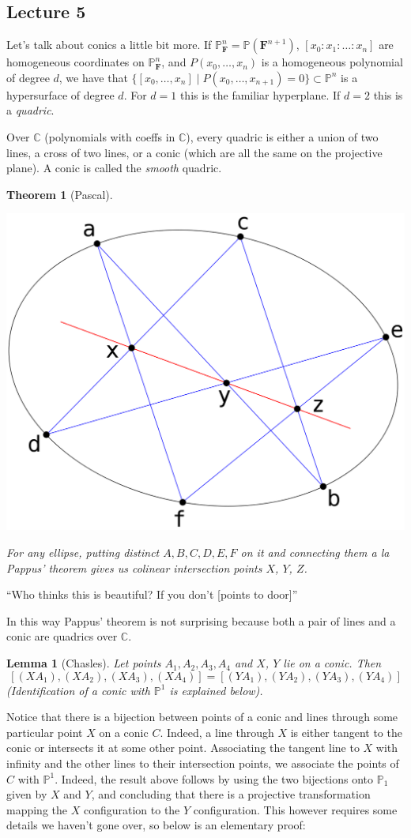 \documentclass[12pt]{article}
\newcommand{\F}{\mathbf{F}}
\newcommand{\C}{\mathbb{C}}
\renewcommand{\P}{\mathbb{P}}
\newtheorem{theorem}{Theorem}[section]
\newtheorem{lemma}{Lemma}[section]
\begin{document}
    \subsection{Lecture 5}
    Let's talk about conics a little bit more. If $\P_\F^n = \P(\F^{n+1})$, $[x_0: x_1: \dots : x_n]$ are homogeneous coordinates on $\P_\F^n$, and $P(x_0, \dots, x_n)$ is a homogeneous polynomial of degree $d$, we have that $\{[x_0, \dots, x_n] \mid P(x_0, \dots, x_{n+1}) = 0\} \subset \P^n$ is a hypersurface of degree $d$. For $d = 1$ this is the familiar hyperplane. If $d = 2$ this is a \textit{quadric}. \par
    Over $\C$ (polynomials with coeffs in $\C$), every quadric is either a union of two lines, a cross of two lines, or a conic (which are all the same on the projective plane). A conic is called the \textit{smooth} quadric. \par
    \begin{theorem}[Pascal]
        \hfill
        \begin{center}
            \includegraphics[width = 0.4\linewidth]{pascal.png}
        \end{center}
        For any ellipse, putting distinct $A, B, C, D, E, F$ on it and connecting them a la Pappus' theorem gives us colinear intersection points $X$, $Y$, $Z$.
    \end{theorem}
    ``Who thinks this is beautiful? If you don't [points to door]''\par
    In this way Pappus' theorem is not surprising because both a pair of lines and a conic are quadrics over $\C$. \par
    \begin{lemma}[Chasles]
        Let points $A_1, A_2, A_3, A_4$ and $X$, $Y$ lie on a conic. Then
        $$[(XA_1), (XA_2), (XA_3), (XA_4)] =  [(YA_1), (YA_2), (YA_3), (YA_4)]$$
        (Identification of a conic with $\P^1$ is explained below).
    \end{lemma}
    Notice that there is a bijection between points of a conic and lines through some particular point $X$ on a conic $C$. Indeed, a line through $X$ is either tangent to the conic or intersects it at some other point. Associating the tangent line to $X$ with infinity and the other lines to their intersection points, we associate the points of $C$ with $\P^1$. Indeed, the result above follows by using the two bijections onto $\P_1$ given by $X$ and $Y$, and concluding that there is a projective transformation mapping the $X$ configuration to the $Y$ configuration. This however requires some details we haven't gone over, so below is an elementary proof:
\end{document}
